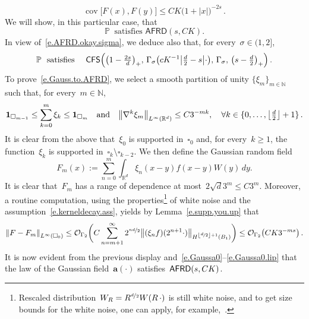 \documentclass[11pt,twoside]{article} %
\let\oldsquare\square %
\renewcommand{\square}{\oldsquare}
\numberwithin{equation}{section}
\theoremstyle{definition}
\let\originalleft\left
\let\originalright\right
\renewcommand{\left}{\mathopen{}\mathclose\bgroup\originalleft}
\renewcommand{\right}{\aftergroup\egroup\originalright}
\newcommand*{\N}{\ensuremath{\mathbb{N}}}
\newcommand*{\Rd}{\ensuremath{\mathbb{R}^d}}
\renewcommand{\a}{\mathbf{a}}
\newcommand{\cu}{\square}
\renewcommand{\P}{\mathbb{P}}
\renewcommand{\O}{\mathcal{O}}
\newcommand{\indc}{\boldsymbol{1}}
\DeclareMathOperator{\cov}{cov}
\newcommand{\CFS}{\mathsf{CFS}}
\newcommand{\AFRD}{\mathsf{AFRD}}
\begin{document}
\begin{equation*}
\cov\bigl[F(x),F(y) \bigr]
\leq
CK \bigl(1+|x| \bigr)^{-2s}
\,.
\end{equation*}
We will show, in this particular case, that  
\begin{equation}
\label{e.Gauss.to.AFRD}
\P \ \mbox{ satisfies } \AFRD(s,CK).
\end{equation}
In view of~\eqref{e.AFRD.okay.sigma},
we deduce also that, for every~$\sigma \in (1,2]$, 
\begin{align}
\label{e.Gauss.to.CFS}
\P \ \mbox{ satisfies }  \quad
\CFS \Bigl(  
\bigl( 1 - \tfrac {2s}{d} \bigr)_+ , \,
\Gamma_\sigma \bigl( cK^{-1} \bigl| \tfrac d2-s\bigr| \cdot \bigr), \,
\Gamma_\sigma, \,
\bigl( s - \tfrac d2 \bigr)_+
\Bigr)\,.
\end{align}
To prove~\eqref{e.Gauss.to.AFRD}, we select a smooth partition of unity 
$\{ \xi_{m} \}_{m\in\N}$ such that, for every~$m\in\N$, 
\begin{align*}
\indc_{\cu_{m-1}}
\leq
\sum_{k=0}^m \xi_k
\leq
\indc_{\cu_{m}}
\quad \text{and} \quad
\big\| \nabla^k \xi_m \big\|_{L^\infty(\Rd)}
\leq 
C3^{-mk},
\quad 
\forall k\in\{ 0,\ldots, \left\lfloor \tfrac d2 \right\rfloor +1\}
\,.
\end{align*}
It is clear from the above that~$\xi_0$ is supported in~$\cu_0$ and, for every~$k\geq1$, the function~$\xi_{k}$ is supported in~$\cu_k\setminus\cu_{k-2}$. We then define the Gaussian random field 
\begin{equation*}
F_m(x):= \sum_{n=0}^m 
\int_{\Rd} \xi_n(x-y) f(x-y) W(y)\,dy.
\end{equation*}
It is clear that~$F_m$ has a range of dependence at most~$2\sqrt{d} 3^m \leq C3^m$. Moreover, a routine computation, using the properties\footnote{Rescaled distribution~$W_R = R^{\nicefrac d2} W(R \, \cdot )$ is still white noise, and to get size bounds for the white noise,  one can apply, for example,~\cite[Proposition 5.14]{AKMBook}.}  of white noise and the assumption~\eqref{e.kerneldecay.ass}, yields by Lemma~\ref{e.supp.you.up} that
\begin{equation*}
\left\| F - F_m \right\|_{L^\infty(\cu_0)} 
\leq 
\O_{\Gamma_2}\biggl(
C \sum_{n=m+1}^\infty 2^{ \nicefrac{ n d}2  } \big\| (\xi_n f)(2^{n+1} \cdot ) \big\|_{H^{\left\lfloor \nicefrac d2 \right\rfloor +1}(B_{1})} 
\biggr)
\leq 
\O_{\Gamma_2}\bigl( CK 3^{-m s}\bigr)
\,.
\end{equation*}
It is now evident from the previous display and~\eqref{e.Gaussa0}--\eqref{e.Gaussa0.lip} that the law of the Gaussian field~$\a(\cdot)$ satisfies~$\AFRD\left(s,CK\right)$. 
\end{document}
